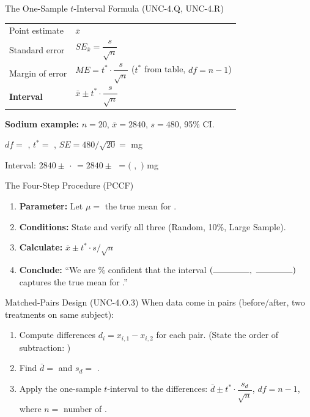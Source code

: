 \documentclass[10pt]{article}
\begin{document}
\begin{notesbox}{The One-Sample $t$-Interval Formula (UNC-4.Q, UNC-4.R)}
\renewcommand{\arraystretch}{2}
\begin{tabularx}{\linewidth}{lX}
    Point estimate & $\bar x$ \\
    Standard error & $SE_{\bar x} = \dfrac{s}{\sqrt{n}}$ \\
    Margin of error & $ME = t^* \cdot \dfrac{s}{\sqrt{n}}$ \quad ($t^*$ from table, $df = n - 1$) \\
    \textbf{Interval} & $\bar x \pm t^* \cdot \dfrac{s}{\sqrt{n}}$ \\
\end{tabularx}

\vspace{0.1in}
\textbf{Sodium example:} $n = 20$, $\bar x = 2840$, $s = 480$, 95\% CI.

$df = $ , \quad $t^* = $ , \quad $SE = 480/\sqrt{20} = $  mg

Interval: $2840 \pm $  $\cdot$  $= 2840 \pm$ 
$= ($ $,$ $)$ mg
\end{notesbox}

\begin{notesbox}{The Four-Step Procedure (PCCF)}
\begin{enumerate}
    \item \textbf{Parameter:} Let $\mu = $ the true mean \ans{[quantity]} for \ans{[population]}.
    \item \textbf{Conditions:} State and verify all three (Random, 10\%, Large Sample).
    \item \textbf{Calculate:} $\bar x \pm t^* \cdot s/\sqrt{n}$
    \item \textbf{Conclude:} ``We are \% confident that the interval
          $(\rule{1.5cm}{0.4pt},\ \rule{1.5cm}{0.4pt})$ captures the true mean
          \ans{[quantity]} for \ans{[population]}.''
\end{enumerate}
\end{notesbox}

\begin{notesbox}{Matched-Pairs Design (UNC-4.O.3)}
When data come in pairs (before/after, two treatments on same subject):
\begin{enumerate}
    \item Compute differences $d_i = x_{i,1} - x_{i,2}$ for each pair.
          (State the order of subtraction: )
    \item Find $\bar d = $  and $s_d = $ .
    \item Apply the one-sample $t$-interval to the differences:
          $\bar d \pm t^* \cdot \dfrac{s_d}{\sqrt{n}}$, \quad $df = n - 1$,
          where $n = $ number of .
\end{enumerate}
\end{notesbox}
\end{document}
